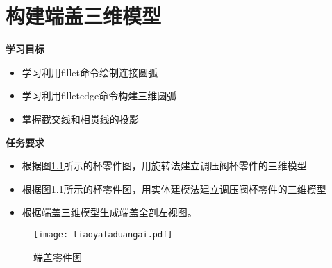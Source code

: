 \chapter{构建端盖三维模型}\label{chap:duangai}

{\bfseries 学习目标}
\begin{itemize}
\item 学习利用fillet命令绘制连接圆弧
\item 学习利用filletedge命令构建三维圆弧
\item 掌握截交线和相贯线的投影
\end{itemize}

{\bfseries 任务要求}
\begin{itemize}
\item 根据图\ref{fig:tiaoyafaduangai}所示的杯零件图，用旋转法建立调压阀杯零件的三维模型
\item 根据图\ref{fig:tiaoyafaduangai}所示的杯零件图，用实体建模法建立调压阀杯零件的三维模型
\item 根据端盖三维模型生成端盖全剖左视图。
\end{itemize}

\noindent
\begin{figure}[htbp]
\centering
\texttt{[image: tiaoyafaduangai.pdf]}
\caption{端盖零件图}\label{fig:tiaoyafaduangai}
\end{figure}
\clearpage






\endinput